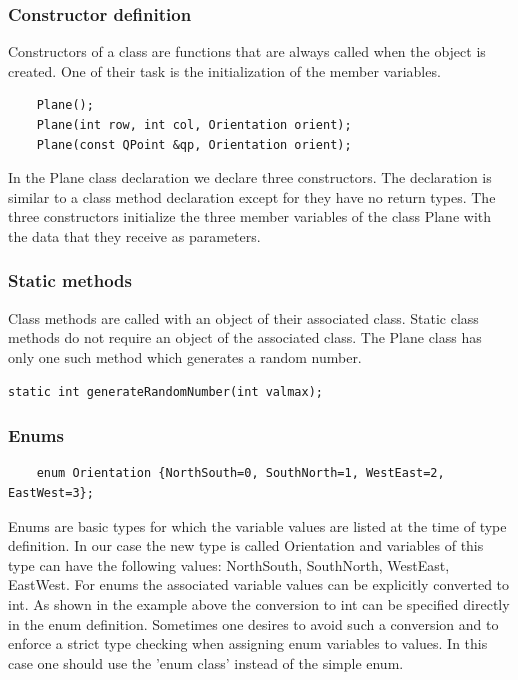 \subsubsection {Constructor definition}
Constructors of a class are functions that are always called when the object is created. One of their task is the initialization of the member variables.
\begin{lstlisting}
    Plane();
    Plane(int row, int col, Orientation orient);
    Plane(const QPoint &qp, Orientation orient);
\end{lstlisting}
In the Plane class declaration we declare three constructors. The declaration is similar to a class method declaration except for they have no return types. The three constructors initialize the three member variables of the class Plane with the data that they receive as parameters. 

\subsubsection {Static methods}
Class methods are called with an object of their associated class. Static class methods do not require an object of the associated class. The Plane class has only one such method which generates a random number.
\begin{lstlisting}
static int generateRandomNumber(int valmax);
\end{lstlisting}

\subsubsection {Enums}

\begin{lstlisting}
    enum Orientation {NorthSouth=0, SouthNorth=1, WestEast=2, EastWest=3};
\end{lstlisting}
Enums are basic types for which the variable values are listed at the time of type definition. In our case the new type is called Orientation and variables of this type can have the following values: NorthSouth, SouthNorth, WestEast, EastWest. For enums the associated variable values can be explicitly converted to int. As shown in the example above the conversion to int can be specified directly in the enum definition. Sometimes one desires to avoid such a conversion and to enforce a strict type checking when assigning enum variables to values. In this case one should use the 'enum class' instead of the simple enum.  


